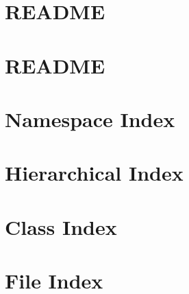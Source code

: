 \let\mypdfximage\pdfximage\def\pdfximage{\immediate\mypdfximage}\documentclass[twoside]{book}
\newcommand{\+}{\discretionary{\mbox{\scriptsize$\hookleftarrow$}}{}{}}
\begin{document}
\chapter{README}
\label{md_smacc2_sm_reference_library_sm_respira_1_README}

\chapter{README}
\label{md_smacc2_sm_reference_library_sm_three_some_README}

\chapter{Namespace Index}

\chapter{Hierarchical Index}

\chapter{Class Index}

\chapter{File Index}

\end{document}
